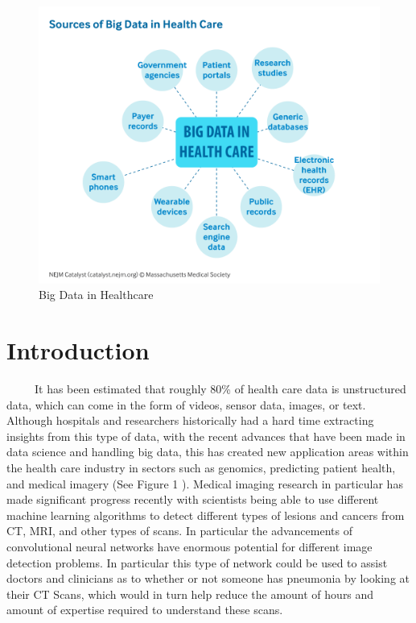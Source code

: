 \documentclass[12pt]{article}
\begin{document}
\begin{figure}

{\centering \includegraphics[width=0.75\linewidth,height=0.25\textheight]{images/big-data-healthcare} 

}

\caption{Big Data in Healthcare}\label{fig:sample-fig1}
\end{figure}

\hypertarget{introduction}{%
\section{Introduction}\label{introduction}}

~~~~~It has been estimated that roughly 80\% of health care data is
unstructured data, which can come in the form of videos, sensor data,
images, or text. Although hospitals and researchers historically had a
hard time extracting insights from this type of data, with the recent
advances that have been made in data science and handling big data, this
has created new application areas within the health care industry in
sectors such as genomics, predicting patient health, and medical imagery
(See Figure 1 \citep{NEJM}). Medical imaging research in particular has
made significant progress recently with scientists being able to use
different machine learning algorithms to detect different types of
lesions and cancers from CT, MRI, and other types of scans. In
particular the advancements of convolutional neural networks have
enormous potential for different image detection problems. In particular
this type of network could be used to assist doctors and clinicians as
to whether or not someone has pneumonia by looking at their CT Scans,
which would in turn help reduce the amount of hours and amount of
expertise required to understand these scans.
\end{document}
